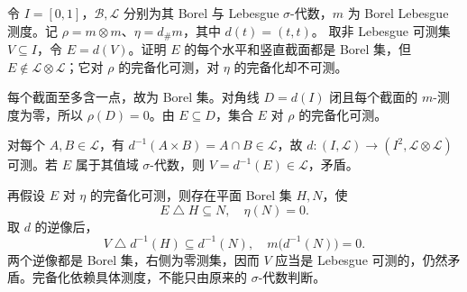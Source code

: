 \begin{optionalexercise}\label{b1:ex:07-completions-diagonal}
令 \(I=[0,1]\)，\(\mathcal B,\mathcal L\) 分别为其 Borel 与 Lebesgue \(\sigma\)-代数，\(m\) 为 Borel Lebesgue 测度。记
\(\rho=m\otimes m\)、\(\eta=d_\#m\)，其中 \(d(t)=(t,t)\)。
取非 Lebesgue 可测集 \(V\subseteq I\)，令 \(E=d(V)\)。证明 \(E\) 的每个水平和竖直截面都是 Borel 集，但 \(E\notin\mathcal L\otimes\mathcal L\)；它对 \(\rho\) 的完备化可测，对 \(\eta\) 的完备化却不可测。
\end{optionalexercise}
\begin{solution}
每个截面至多含一点，故为 Borel 集。对角线 \(D=d(I)\) 闭且每个截面的 \(m\)-测度为零，所以 \(\rho(D)=0\)。由 \(E\subseteq D\)，集合 \(E\) 对 \(\rho\) 的完备化可测。

对每个 \(A,B\in\mathcal L\)，有 \(d^{-1}(A\times B)=A\cap B\in\mathcal L\)，故 \(d:(I,\mathcal L)\rightarrow(I^2,\mathcal L\otimes\mathcal L)\) 可测。若 \(E\) 属于其值域 \(\sigma\)-代数，则 \(V=d^{-1}(E)\in\mathcal L\)，矛盾。

再假设 \(E\) 对 \(\eta\) 的完备化可测，则存在平面 Borel 集 \(H,N\)，使
\[
E\mathbin{\triangle}H\subseteq N,\quad \eta(N)=0.
\]
取 \(d\) 的逆像后，
\[
V\mathbin{\triangle}d^{-1}(H)\subseteq d^{-1}(N),
\quad m\bigl(d^{-1}(N)\bigr)=0.
\]
两个逆像都是 Borel 集，右侧为零测集，因而 \(V\) 应当是 Lebesgue 可测的，仍然矛盾。完备化依赖具体测度，不能只由原来的 \(\sigma\)-代数判断。
\end{solution}

